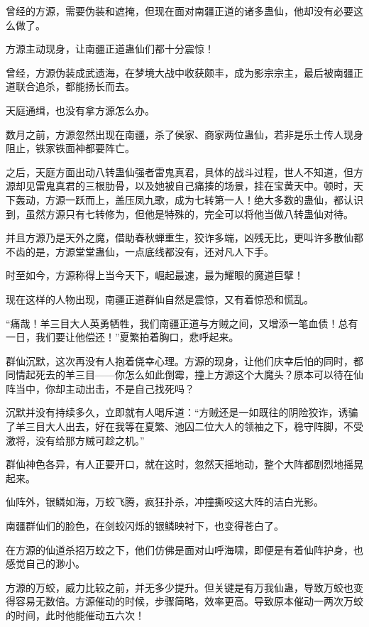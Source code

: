 
\begin{this_body}



曾经的方源，需要伪装和遮掩，但现在面对南疆正道的诸多蛊仙，他却没有必要这么做了。

方源主动现身，让南疆正道蛊仙们都十分震惊！

曾经，方源伪装成武遗海，在梦境大战中收获颇丰，成为影宗宗主，最后被南疆正道联合追杀，都能扬长而去。

天庭通缉，也没有拿方源怎么办。

数月之前，方源忽然出现在南疆，杀了侯家、商家两位蛊仙，若非是乐土传人现身阻止，铁家铁面神都要阵亡。

之后，天庭方面出动八转蛊仙强者雷鬼真君，具体的战斗过程，世人不知道，但方源却见雷鬼真君的三根肋骨，以及她被自己痛揍的场景，挂在宝黄天中。顿时，天下轰动，方源一跃而上，盖压凤九歌，成为七转第一人！绝大多数的蛊仙，都认识到，虽然方源只有七转修为，但他是特殊的，完全可以将他当做八转蛊仙对待。

并且方源乃是天外之魔，借助春秋蝉重生，狡诈多端，凶残无比，更叫许多散仙都不齿的是，方源堂堂蛊仙，一点底线都没有，还对凡人下手。

时至如今，方源称得上当今天下，崛起最速，最为耀眼的魔道巨擘！

现在这样的人物出现，南疆正道群仙自然是震惊，又有着惊恐和慌乱。

“痛哉！羊三目大人英勇牺牲，我们南疆正道与方贼之间，又增添一笔血债！总有一日，我们要让他偿还！”夏繁拍着胸口，悲呼起来。

群仙沉默，这次再没有人抱着侥幸心理。方源的现身，让他们庆幸后怕的同时，都同情起死去的羊三目——你怎么如此倒霉，撞上方源这个大魔头？原本可以待在仙阵当中，你却主动出击，不是自己找死吗？

沉默并没有持续多久，立即就有人喝斥道：“方贼还是一如既往的阴险狡诈，诱骗了羊三目大人出去，好在我等在夏繁、池囚二位大人的领袖之下，稳守阵脚，不受激将，没有给那方贼可趁之机。”

群仙神色各异，有人正要开口，就在这时，忽然天摇地动，整个大阵都剧烈地摇晃起来。

仙阵外，银鳞如海，万蛟飞腾，疯狂扑杀，冲撞撕咬这大阵的洁白光影。

南疆群仙们的脸色，在剑蛟闪烁的银鳞映衬下，也变得苍白了。

在方源的仙道杀招万蛟之下，他们仿佛是面对山呼海啸，即便是有着仙阵护身，也感觉自己的渺小。

方源的万蛟，威力比较之前，并无多少提升。但关键是有万我仙蛊，导致万蛟也变得容易无数倍。方源催动的时候，步骤简略，效率更高。导致原本催动一两次万蛟的时间，此时他能催动五六次！


\end{this_body}
